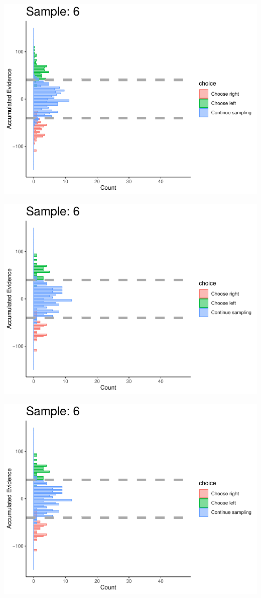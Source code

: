 \documentclass[
]{book}
\begin{document}
\begin{center}\includegraphics[width=0.8\linewidth]{LateNightBayes_files/figure-latex/collapsing_check-50} \end{center}

\begin{center}\includegraphics[width=0.8\linewidth]{LateNightBayes_files/figure-latex/collapsing_check-51} \end{center}

\begin{center}\includegraphics[width=0.8\linewidth]{LateNightBayes_files/figure-latex/collapsing_check-52} \end{center}
\end{document}
